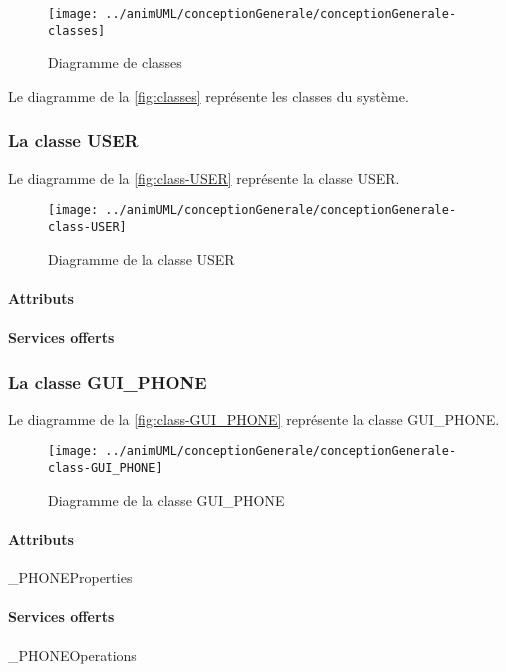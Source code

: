 \begin{figure}[H]
	\centering
	\texttt{[image: ../animUML/conceptionGenerale/conceptionGenerale-classes]}
	\caption{Diagramme de classes}
	\label{fig:classes}
\end{figure}
Le diagramme de la \autoref{fig:classes} représente les classes du système.

\subsubsection{La classe USER}

Le diagramme de la \autoref{fig:class-USER} représente la classe USER.
\begin{figure}[H]
	\centering
	\texttt{[image: ../animUML/conceptionGenerale/conceptionGenerale-class-USER]}
	\caption{Diagramme de la classe USER}
	\label{fig:class-USER}
\end{figure}


\paragraph{Attributs}
\classUSERProperties
\paragraph{Services offerts}
\classUSEROperations
\subsubsection{La classe GUI_PHONE}

Le diagramme de la \autoref{fig:class-GUI_PHONE} représente la classe GUI_PHONE.
\begin{figure}[H]
	\centering
	\texttt{[image: ../animUML/conceptionGenerale/conceptionGenerale-class-GUI\_PHONE]}
	\caption{Diagramme de la classe GUI_PHONE}
	\label{fig:class-GUI_PHONE}
\end{figure}


\paragraph{Attributs}
\classGUI_PHONEProperties
\paragraph{Services offerts}
\classGUI_PHONEOperations
